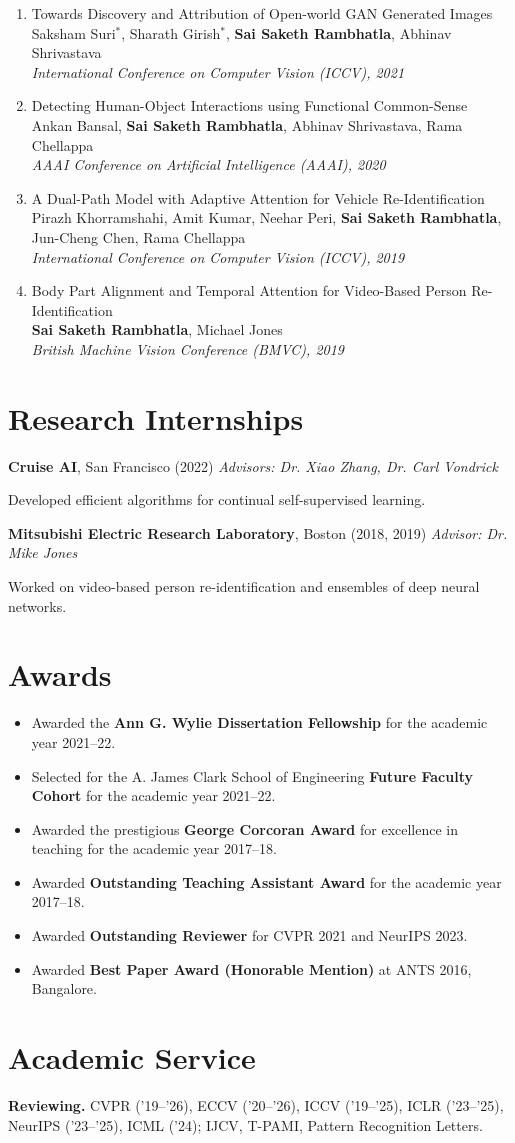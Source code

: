 \documentclass[10pt, letterpaper]{article}
\newcommand{\pub}[3]{\item\begin{minipage}[t]{\linewidth}#1\\{\small #2}\\{\small\itshape\color{muted} #3}\end{minipage}}
\newcommand{\intern}[5]{\textbf{#1}, #2 (#3)\hfill{\itshape\color{muted} #4}\par{\leftskip=0.4cm #5\par}\vspace{0.18cm}}
\newcommand{\me}{\textbf{Sai Saketh Rambhatla}}
\begin{document}
\begin{enumerate}[leftmargin=0.7cm, topsep=0pt, itemsep=4pt, label={\small\color{accent}\arabic*.}]
\pub{Towards Discovery and Attribution of Open-world GAN Generated Images}{Saksham Suri$^{*}$, Sharath Girish$^{*}$, \me, Abhinav Shrivastava}{International Conference on Computer Vision (ICCV), 2021}
\pub{Detecting Human-Object Interactions using Functional Common-Sense}{Ankan Bansal, \me, Abhinav Shrivastava, Rama Chellappa}{AAAI Conference on Artificial Intelligence (AAAI), 2020}
\pub{A Dual-Path Model with Adaptive Attention for Vehicle Re-Identification}{Pirazh Khorramshahi, Amit Kumar, Neehar Peri, \me, Jun-Cheng Chen, Rama Chellappa}{International Conference on Computer Vision (ICCV), 2019}
\pub{Body Part Alignment and Temporal Attention for Video-Based Person Re-Identification}{\me, Michael Jones}{British Machine Vision Conference (BMVC), 2019}
\end{enumerate}
\section{Research Internships}
\intern{Cruise AI}{San Francisco}{2022}{Advisors: Dr. Xiao Zhang, Dr. Carl Vondrick}{Developed efficient algorithms for continual self-supervised learning.}
\intern{Mitsubishi Electric Research Laboratory}{Boston}{2018, 2019}{Advisor: Dr. Mike Jones}{Worked on video-based person re-identification and ensembles of deep neural networks.}
\section{Awards}
\begin{itemize}[leftmargin=0.5cm, topsep=0pt, itemsep=1pt, parsep=0pt, label={\color{accent}\textperiodcentered}]
\item Awarded the \textbf{Ann G. Wylie Dissertation Fellowship} for the academic year 2021--22.
\item Selected for the A. James Clark School of Engineering \textbf{Future Faculty Cohort} for the academic year 2021--22.
\item Awarded the prestigious \textbf{George Corcoran Award} for excellence in teaching for the academic year 2017--18.
\item Awarded \textbf{Outstanding Teaching Assistant Award} for the academic year 2017--18.
\item Awarded \textbf{Outstanding Reviewer} for CVPR 2021 and NeurIPS 2023.
\item Awarded \textbf{Best Paper Award (Honorable Mention)} at ANTS 2016, Bangalore.
\end{itemize}
\section{Academic Service}
\textbf{Reviewing.} CVPR ('19--'26), ECCV ('20--'26), ICCV ('19--'25), ICLR ('23--'25), NeurIPS ('23--'25), ICML ('24); IJCV, T-PAMI, Pattern Recognition Letters.
\end{document}
